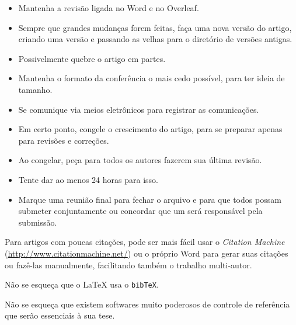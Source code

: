 \begin{itemize}
  \item Mantenha a revisão ligada no Word e no Overleaf.
  \item Sempre que grandes mudanças forem feitas, faça uma nova versão do artigo, criando uma versão e passando as velhas para o diretório de versões antigas.
  \item Possivelmente quebre o artigo em partes.
  \item Mantenha o formato da conferência o mais cedo possível, para ter ideia de tamanho.
  \item Se comunique via meios eletrônicos para registrar as comunicações. 
  \item Em certo ponto, congele o crescimento do artigo, para se preparar apenas para revisões e correções. 
  \item Ao congelar, peça para todos os autores fazerem sua última revisão. 
  \item Tente dar ao menos 24 horas para isso.
  \item Marque uma reunião final para fechar o arquivo e para que todos possam submeter conjuntamente ou concordar que um será responsável pela submissão.
\end{itemize}

Para artigos com poucas citações, pode ser mais fácil usar o \textit{Citation Machine} (\url{http://www.citationmachine.net/}) ou o próprio Word para gerar suas citações ou fazê-las manualmente, facilitando também o trabalho multi-autor.

Não se esqueça que o LaTeX usa o \texttt{bibTeX}.

Não se esqueça que existem softwares muito poderosos de controle de referência que serão essenciais à sua tese.

